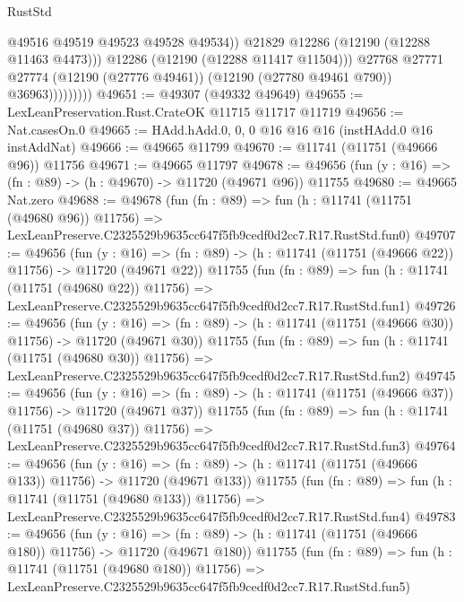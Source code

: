 \begin{lexlean}{RustStd}
\begin{coremodule}
                              @49516
                              @49519
                              @49523
                              @49528
                              @49534))
                          @21829
                          @12286
                          (@12190 (@12288 @11463 @4473)))
                        @12286
                        (@12190 (@12288 @11417 @11504)))
                      @27768
                      @27771
                      @27774
                      (@12190 (@27776 @49461))
                      (@12190 (@27780 @49461 @790))
                      @36963)))))))))
@49651 := @49307 (@49332 @49649)
@49655 := LexLeanPreservation.Rust.CrateOK @11715 @11717 @11719
@49656 := Nat.casesOn.{0}
@49665 := HAdd.hAdd.{0, 0, 0} @16 @16 @16 (instHAdd.{0} @16 instAddNat)
@49666 := @49665 @11799
@49670 := @11741 (@11751 (@49666 @96)) @11756
@49671 := @49665 @11797
@49678 := @49656 (fun (y : @16) => (fn : @89) -> (h : @49670) -> @11720 (@49671 @96)) @11755
@49680 := @49665 Nat.zero
@49688 := @49678
    (fun (fn : @89) =>
    fun (h : @11741 (@11751 (@49680 @96)) @11756) =>
    LexLeanPreserve.C2325529b9635cc647f5fb9cedf0d2cc7.R17.RustStd.fun0)
@49707 := @49656
    (fun (y : @16) =>
    (fn : @89) -> (h : @11741 (@11751 (@49666 @22)) @11756) -> @11720 (@49671 @22))
    @11755
    (fun (fn : @89) =>
    fun (h : @11741 (@11751 (@49680 @22)) @11756) =>
    LexLeanPreserve.C2325529b9635cc647f5fb9cedf0d2cc7.R17.RustStd.fun1)
@49726 := @49656
    (fun (y : @16) =>
    (fn : @89) -> (h : @11741 (@11751 (@49666 @30)) @11756) -> @11720 (@49671 @30))
    @11755
    (fun (fn : @89) =>
    fun (h : @11741 (@11751 (@49680 @30)) @11756) =>
    LexLeanPreserve.C2325529b9635cc647f5fb9cedf0d2cc7.R17.RustStd.fun2)
@49745 := @49656
    (fun (y : @16) =>
    (fn : @89) -> (h : @11741 (@11751 (@49666 @37)) @11756) -> @11720 (@49671 @37))
    @11755
    (fun (fn : @89) =>
    fun (h : @11741 (@11751 (@49680 @37)) @11756) =>
    LexLeanPreserve.C2325529b9635cc647f5fb9cedf0d2cc7.R17.RustStd.fun3)
@49764 := @49656
    (fun (y : @16) =>
    (fn : @89) -> (h : @11741 (@11751 (@49666 @133)) @11756) -> @11720 (@49671 @133))
    @11755
    (fun (fn : @89) =>
    fun (h : @11741 (@11751 (@49680 @133)) @11756) =>
    LexLeanPreserve.C2325529b9635cc647f5fb9cedf0d2cc7.R17.RustStd.fun4)
@49783 := @49656
    (fun (y : @16) =>
    (fn : @89) -> (h : @11741 (@11751 (@49666 @180)) @11756) -> @11720 (@49671 @180))
    @11755
    (fun (fn : @89) =>
    fun (h : @11741 (@11751 (@49680 @180)) @11756) =>
    LexLeanPreserve.C2325529b9635cc647f5fb9cedf0d2cc7.R17.RustStd.fun5)

\end{coremodule}
\end{lexlean}
